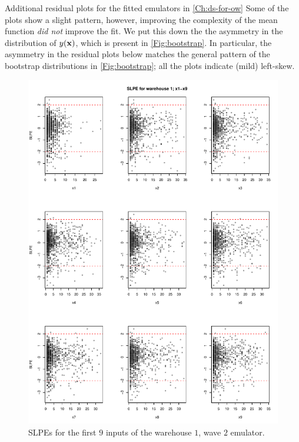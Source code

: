 \begin{chapter}{Additional residual plots  for the fitted emulators in \cref{Ch:ds-for-ow} \label{App:resid}}
Some of the plots show a slight pattern, however, improving the complexity of the mean function \textit{did not} improve the fit. We put this down the the asymmetry in the distribution of $y(\mathbf{x})$, which is present in \cref{Fig:bootstrap}. In particular, the asymmetry in the residual plots below matches the general pattern of the bootstrap distributions in \cref{Fig:bootstrap}; all the plots indicate (mild) left-skew.
\begin{figure}
  \centering
  \includegraphics[width=\textwidth]{fig-app-ds/w2-w1-1.pdf}
  \caption{SLPEs for the first $9$ inputs of the warehouse $1$, wave $2$ emulator.}
\end{figure}


\end{chapter}
